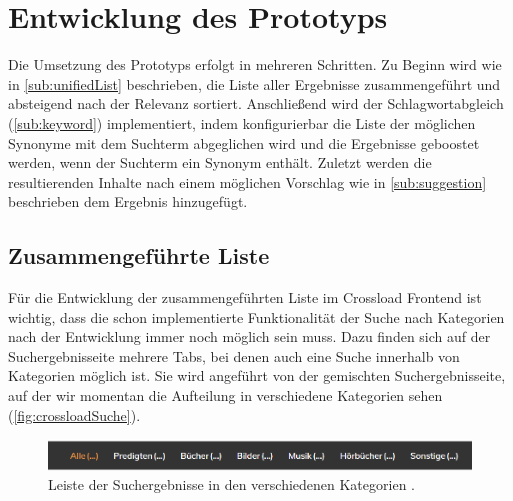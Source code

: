 \chapter{Entwicklung des Prototyps}
\label{ch:development}

Die Umsetzung des Prototyps erfolgt in mehreren Schritten. Zu Beginn wird wie in \ref{sub:unifiedList} beschrieben, die Liste aller Ergebnisse zusammengeführt und absteigend nach der Relevanz sortiert. Anschließend wird der Schlagwortabgleich (\ref{sub:keyword}) implementiert, indem konfigurierbar die Liste der möglichen Synonyme mit dem Suchterm abgeglichen wird und die Ergebnisse geboostet werden, wenn der Suchterm ein Synonym enthält. Zuletzt werden die resultierenden Inhalte nach einem möglichen Vorschlag wie in \ref{sub:suggestion} beschrieben dem Ergebnis hinzugefügt.

\section{Zusammengeführte Liste}
\label{sec:devUnifiedList}

Für die Entwicklung der zusammengeführten Liste im Crossload Frontend ist wichtig, dass die schon implementierte Funktionalität der Suche nach Kategorien nach der Entwicklung immer noch möglich sein muss.
Dazu finden sich auf der Suchergebnisseite mehrere Tabs, bei denen auch eine Suche innerhalb von Kategorien möglich ist.
Sie wird angeführt von der gemischten Suchergebnisseite, auf der wir momentan die Aufteilung in verschiedene Kategorien sehen (\ref{fig:crossloadSuche}).

\begin{figure}[h]
  \begin{centering}
    \includegraphics[width=\textwidth]{figures/development/kategorienLeiste.png}
    \caption{Leiste der Suchergebnisse in den verschiedenen Kategorien  \cite{pfleiderer2022}.}
    \label{fig:kategorienLeiste}
  \end{centering}
\end{figure}

